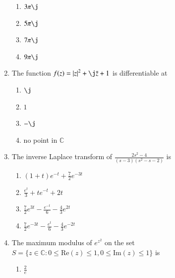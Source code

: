 \documentclass[journal,12pt,twocolumn]{IEEEtran}
\begin{document}
\begin{enumerate}[1.]
\begin{enumerate}

\item $
3 \pi \j
$

\item $
5 \pi \j
$

\item $
7 \pi \j
$

\item $
9 \pi \j
$

\end{enumerate}

\item The function $f(z)= { \abs{z}}^2 + \j \bar{z} + 1 $ is differentiable at

\begin{enumerate}

\item $
\j
$

\item $
1
$

\item $
-\j
$

\item 
no point in $ \mathbb{C}
$

\end{enumerate}

\item The inverse Laplace transform of $ \frac{2s^2-4}{(s-3)(s^2-s-2)} $ is

\begin{enumerate}

\item $
(1+t)e^{-t} + \frac{7}{2} e^{-3t} 
$

\item $
\frac{e^t}{3} + t e^{-t} + 2t
$

\item $
\frac{7}{2} e^{3t} - \frac{e^{-t}}{6} - \frac{4}{3} e^{2t}
$

\item $
\frac{7}{2} e^{-3t} - \frac{e^{t}}{6} - \frac{4}{3} e^{-2t}
$

\end{enumerate}

\item The maximum modulus of $ e^ {z^2} $ on the set $S = \lbrace z \in \mathbb{C} : 0 \leq \text{Re}(z) \leq 1, 0 \leq \text{Im}(z) \leq 1 \rbrace $ is

\begin{enumerate}

\item $
\frac{2}{e}
$


\end{enumerate}
\end{enumerate}
\end{document}
